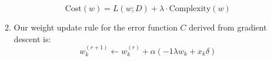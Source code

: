 \documentclass[11pt]{article}
\begin{document}
\begin{enumerate}
\begin{enumerate}
		\[\text{Cost}(w)=L(w;D) + \lambda \cdot \text{Complexity}(w)\]
	\item Our weight update rule for the error function $C$ derived from gradient descent is:
		\[w_k^{(r+1)}\leftarrow w_k^{(r)} + \alpha(-1 \lambda w_k + x_k \delta)\]
	\end{enumerate}

\end{enumerate}
\end{document}
